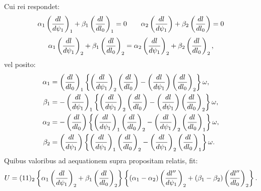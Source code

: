 Cui rei respondet:
\[
 \alpha_1\left({dl\over d\psi_1}\right)_1+\beta_1\left({dl\over dl_0}\right)_1=0
 \qquad
 \alpha_2\left({dl\over d\psi_1}\right)+\beta_2\left({dl\over dl_0}\right)=0
\]
\[
 \alpha_1\left({dl\over d\psi_1}\right)_2+\beta_1\left({dl\over dl_0}\right)_2
 =\alpha_2\left({dl\over d\psi_1}\right)_2+\beta_2\left({dl\over dl_0}\right)_2,
\]
vel posito:
\[
\begin{aligned}
\alpha_1&=\left({dl\over dl_0}\right)_1
\left\{\left({dl\over d\psi_1}\right)_2\left({dl\over dl_0}\right)-\left({dl\over d\psi_1}\right)\left({dl\over dl_0}\right)_2\right\}\omega,\\
\beta_1&=-\left({dl\over d\psi_1}\right)_1
\left\{\left({dl\over d\psi_1}\right)_2\left({dl\over dl_0}\right)-\left({dl\over d\psi_1}\right)\left({dl\over dl_0}\right)_2\right\}\omega,\\
\alpha_2&=-\left({dl\over dl_0}\right)
\left\{\left({dl\over d\psi_1}\right)_1\left({dl\over dl_0}\right)_2-\left({dl\over d\psi_1}\right)_2\left({dl\over dl_0}\right)_1\right\}\omega,\\
\beta_2&=\left({dl\over d\psi_1}\right)
\left\{\left({dl\over d\psi_1}\right)_1\left({dl\over dl_0}\right)_2-\left({dl\over d\psi_1}\right)_2\left({dl\over dl_0}\right)_1\right\}\omega.
\end{aligned}
\]
Quibus valoribus ad aequationem supra propositam relatis, fit:
\[
 U=(11)_2\left\{\alpha_1\left({dl\over d\psi_1}\right)_2+\beta_1\left({dl\over dl_0}\right)_2\right\}
\left\{(\alpha_1-\alpha_2)\left({dl''\over d\psi_1}\right)_2+(\beta_1-\beta_2)\left({dl''\over dl_0}\right)_2\right\}.
\]
